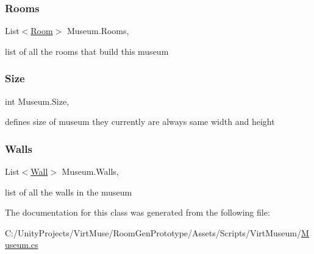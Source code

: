 \subsubsection{\texorpdfstring{Rooms}{Rooms}}
{\footnotesize\ttfamily List$<$\mbox{\hyperlink{class_room}{Room}}$>$ Museum.\+Rooms\hspace{0.3cm}{\ttfamily [get]}, {}}



list of all the rooms that build this museum 

\mbox{\label{class_museum_a954b0f1a64a26af54502b46c4058d99d}} 
\subsubsection{\texorpdfstring{Size}{Size}}
{\footnotesize\ttfamily int Museum.\+Size\hspace{0.3cm}{\ttfamily [get]}, {\ttfamily [set]}}



defines size of museum they currently are always same width and height 

\mbox{\label{class_museum_a4851cdf10f162bbf4b26c757874031da}} 
\subsubsection{\texorpdfstring{Walls}{Walls}}
{\footnotesize\ttfamily List$<$\mbox{\hyperlink{class_wall}{Wall}}$>$ Museum.\+Walls\hspace{0.3cm}{\ttfamily [get]}, {}}



list of all the walls in the museum 



The documentation for this class was generated from the following file\+:\begin{DoxyCompactItemize}
\item 
C\+:/\+Unity\+Projects/\+Virt\+Muse/\+Room\+Gen\+Prototype/\+Assets/\+Scripts/\+Virt\+Museum/\mbox{\hyperlink{_museum_8cs}{Museum.\+cs}}\end{DoxyCompactItemize}
